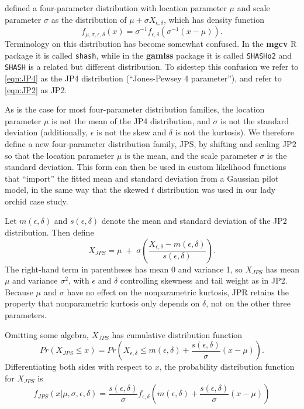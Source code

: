 \documentclass[12pt]{article}
\newcommand{\be}{\begin{equation}}
\newcommand{\ee}{\end{equation}}
\begin{document}
\begin{spacing}{1.35}
\citet{jones-pewsey-2009} defined a four-parameter distribution with location 
parameter $\mu$ and scale parameter $\sigma$ as the distribution of $\mu + \sigma X_{\epsilon, \delta}$, 
which has density function 
\be
f_{\mu, \sigma,  \epsilon,\delta}(x)  = \sigma^{-1}f_{ \epsilon,\delta}( \sigma^{-1}(x - \mu)). 
\label{eqn:JP4} 
\ee
Terminology on this distribution has become somewhat confused. In the \textbf{mgcv} R package 
it is called \texttt{shash}, while in the \textbf{gamlss} package it is called \texttt{SHASHo2} 
and \texttt{SHASH} is a related but different distribution. To sidestep 
this confusion we refer to \eqref{eqn:JP4} as the JP4 distribution (``Jones-Pewsey 4 parameter''), 
and refer to \eqref{eqn:JP2} as JP2. 
  
As is the case for most four-parameter distribution families, 
the location parameter $\mu$ is not the mean of the JP4 distribution, 
and $\sigma$ is not the standard deviation (additionally, $\epsilon$ is not the skew and $\delta$ is not the kurtosis). 
We therefore define a new four-parameter distribution family, JPS, by shifting and scaling JP2
so that the location parameter $\mu$ is the mean, and the scale parameter $\sigma$ is the standard deviation. 
This form can then be used in custom likelihood functions that ``import'' the fitted mean 
and standard deviation from a Gaussian pilot model, in the same way that the skewed $t$ distribution 
was used in our lady orchid case study. 

Let $m(\epsilon,\delta)$ and $s(\epsilon, \delta)$ denote the mean and standard deviation of the 
JP2 distribution. Then define 
\be  
X_{JPS} = \mu \; + \; \sigma \left(\frac{X_{\epsilon,\delta} - m(\epsilon,\delta)}{s(\epsilon,\delta)}\right).
\ee
The right-hand term in parentheses has mean 0 and variance 1, so 
$X_{JPS}$ has mean $\mu$ and variance $\sigma^2$, with $\epsilon$ and $\delta$ controlling skewness
and tail weight as in JP2. Because $\mu$ and $\sigma$ have no effect on the nonparametric kurtosis, 
JPR retains the property that nonparametric kurtosis only depends on $\delta$, not on the other three parameters. 

Omitting some algebra, $X_{JPS}$ has cumulative distribution function 
\be
Pr(X_{JPS} \le x)  = Pr\left(X_{\epsilon,\delta} \le  m(\epsilon,\delta) + \frac{s(\epsilon,\delta)}{\sigma}(x - \mu)\right).
\ee
Differentiating both sides with respect to $x$, the probability distribution function for $X_{JPS}$ is 
\be
f_{JPS}(x \vert \mu, \sigma, \epsilon, \delta) =  \frac{s(\epsilon,\delta)}{\sigma} 
f_{ \epsilon,\delta}\left(m(\epsilon,\delta) + \frac{s(\epsilon,\delta)}{\sigma}(x - \mu) \right) 
\ee


\end{spacing}
\end{document}
